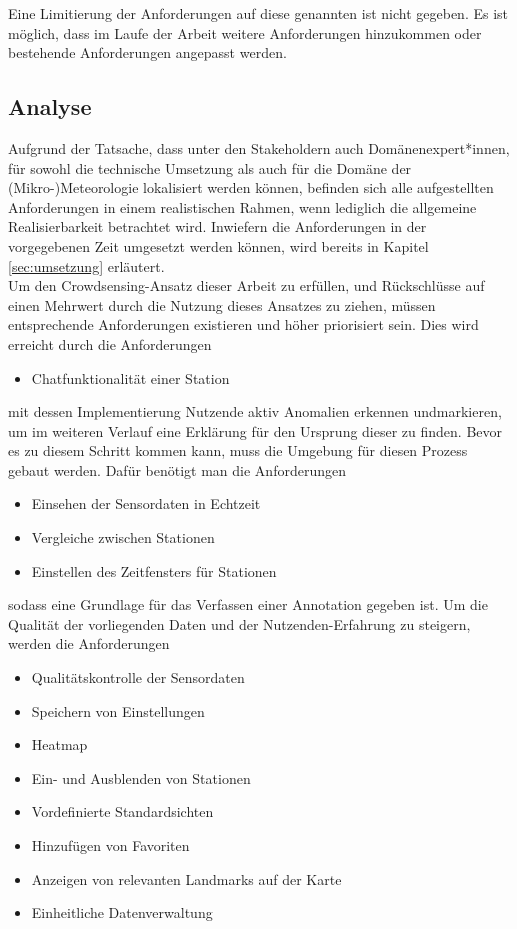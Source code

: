 Eine Limitierung der Anforderungen auf diese genannten ist nicht gegeben. Es ist möglich, dass im Laufe der Arbeit weitere Anforderungen hinzukommen oder bestehende Anforderungen angepasst werden.

\subsection{Analyse}
Aufgrund der Tatsache, dass unter den Stakeholdern auch Domänenexpert*innen, für sowohl die technische Umsetzung als auch für die Domäne der (Mikro-)Meteorologie lokalisiert werden können, befinden sich alle aufgestellten Anforderungen in einem realistischen Rahmen, wenn lediglich die allgemeine Realisierbarkeit betrachtet wird. Inwiefern die Anforderungen in der vorgegebenen Zeit umgesetzt werden können, wird bereits in Kapitel \ref{sec:umsetzung} erläutert. \\ Um den Crowdsensing-Ansatz dieser Arbeit zu erfüllen, und Rückschlüsse auf einen Mehrwert durch die Nutzung dieses Ansatzes zu ziehen, müssen entsprechende Anforderungen existieren und höher priorisiert sein. Dies wird erreicht durch die Anforderungen 

\begin{itemize}
    \item Chatfunktionalität einer Station
\end{itemize}

mit dessen Implementierung Nutzende aktiv Anomalien erkennen undmarkieren, um im weiteren Verlauf eine Erklärung für den Ursprung dieser zu finden. Bevor es zu diesem Schritt kommen kann, muss die Umgebung für diesen Prozess gebaut werden. Dafür benötigt man die Anforderungen 

\begin{itemize}
    \item Einsehen der Sensordaten in Echtzeit
    \item Vergleiche zwischen Stationen
    \item Einstellen des Zeitfensters für Stationen
\end{itemize}

sodass eine Grundlage für das Verfassen einer Annotation gegeben ist. Um die Qualität der vorliegenden Daten und der Nutzenden-Erfahrung zu steigern, werden die Anforderungen 

\begin{itemize}
    \item Qualitätskontrolle der Sensordaten
    \item Speichern von Einstellungen
    \item Heatmap
    \item Ein- und Ausblenden von Stationen
    \item Vordefinierte Standardsichten
    \item Hinzufügen von Favoriten
    \item Anzeigen von relevanten Landmarks auf der Karte
    \item Einheitliche Datenverwaltung
\end{itemize}

